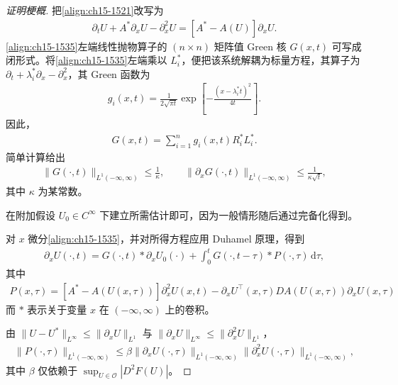 \documentclass[../../main.tex]{subfiles}
\begin{document}
\begin{proof}[证明梗概]
把\eqref{align:ch15-1521}改写为
\begin{align}
\partial_tU+A^*\partial_xU-\partial_x^2U=[A^*-A(U)]\partial_xU.
\label{align:ch15-1535}
\end{align}
\eqref{align:ch15-1535}左端线性抛物算子的 $(n\times n)$ 矩阵值 Green 核 $G(x,t)$ 可写成闭形式。将\eqref{align:ch15-1535}左端乘以 $L_i^*$，便把该系统解耦为标量方程，其算子为 $\partial_t+\lambda_i^*\partial_x-\partial_x^2$，其 Green 函数为
\begin{align}
g_i(x,t)=\frac1{2\sqrt{\pi t}}\exp\left[-\frac{(x-\lambda_i^*t)^2}{4t}\right].
\label{align:ch15-1536}
\end{align}
因此，
\begin{align}
G(x,t)=\sum_{i=1}^ng_i(x,t)R_i^*L_i^*.
\label{align:ch15-1537}
\end{align}
简单计算给出
\begin{align}
\|G(\cdot,t)\|_{L^1(-\infty,\infty)}\leqslant\frac1\kappa,\qquad\|\partial_xG(\cdot,t)\|_{L^1(-\infty,\infty)}\leqslant\frac1{\kappa\sqrt{t}},
\label{align:ch15-1538}
\end{align}
其中 $\kappa$ 为某常数。

在附加假设 $U_0\in C^\infty$ 下建立所需估计即可，因为一般情形随后通过完备化得到。

对 $x$ 微分\eqref{align:ch15-1535}，并对所得方程应用 Duhamel 原理，得到
\begin{align}
\partial_xU(\cdot,t)=G(\cdot,t)*\partial_xU_0(\cdot)+\int_0^tG(\cdot,t-\tau)*P(\cdot,\tau)\,\mathrm{d}\tau,
\label{align:ch15-1539}
\end{align}
其中
\begin{align}
P(x,\tau)=[A^*-A(U(x,\tau))]\partial_x^2U(x,t)-\partial_xU^\top(x,\tau)DA(U(x,\tau))\partial_xU(x,\tau)
\label{align:ch15-15310}
\end{align}
而 $*$ 表示关于变量 $x$ 在 $(-\infty,\infty)$ 上的卷积。

由 $\|U-U^*\|_{L^\infty}\leqslant\|\partial_xU\|_{L^1}$ 与 $\|\partial_xU\|_{L^\infty}\leqslant\|\partial_x^2U\|_{L^1}$，
\begin{align}
\|P(\cdot,\tau)\|_{L^1(-\infty,\infty)}\leqslant\beta\|\partial_xU(\cdot,\tau)\|_{L^1(-\infty,\infty)}\|\partial_x^2U(\cdot,\tau)\|_{L^1(-\infty,\infty)},
\label{align:ch15-15311}
\end{align}
其中 $\beta$ 仅依赖于 $\sup_{U\in\mathscr{O}}|D^2F(U)|$。


\end{proof}
\end{document}
